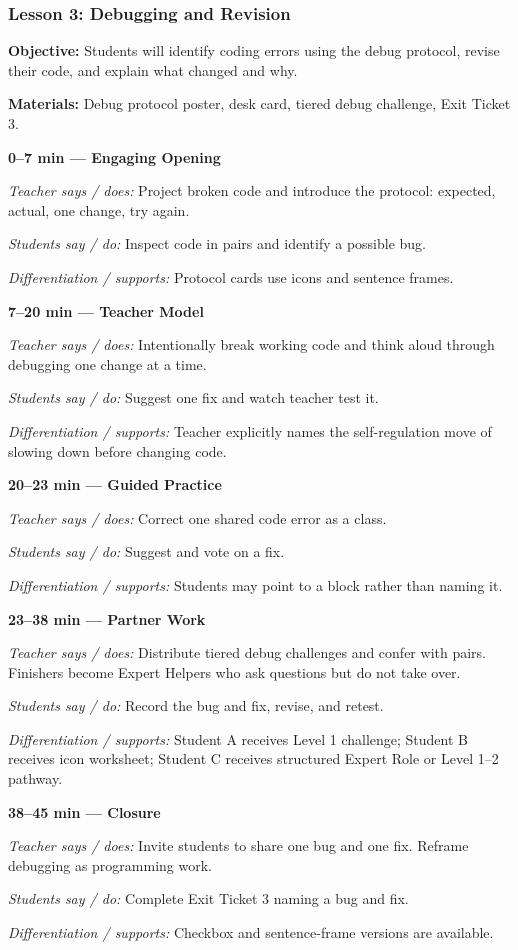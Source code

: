 \documentclass[12pt]{article}
\newcommand{\lessonphase}[5]{%
\noindent\textbf{\color{brickRed}#1 --- #2}\par
\textit{Teacher says / does:} #3\par
\textit{Students say / do:} #4\par
\textit{Differentiation / supports:} #5\par\medskip
}
\begin{document}
\subsubsection*{Lesson 3: Debugging and Revision}
\textbf{Objective:} Students will identify coding errors using the debug protocol, revise their code, and explain what changed and why.\par
\textbf{Materials:} Debug protocol poster, desk card, tiered debug challenge, Exit Ticket 3.\par
\begin{designbox}
\lessonphase{0--7 min}{Engaging Opening}{Project broken code and introduce the protocol: expected, actual, one change, try again.}{Inspect code in pairs and identify a possible bug.}{Protocol cards use icons and sentence frames.}
\lessonphase{7--20 min}{Teacher Model}{Intentionally break working code and think aloud through debugging one change at a time.}{Suggest one fix and watch teacher test it.}{Teacher explicitly names the self-regulation move of slowing down before changing code.}
\lessonphase{20--23 min}{Guided Practice}{Correct one shared code error as a class.}{Suggest and vote on a fix.}{Students may point to a block rather than naming it.}
\lessonphase{23--38 min}{Partner Work}{Distribute tiered debug challenges and confer with pairs. Finishers become Expert Helpers who ask questions but do not take over.}{Record the bug and fix, revise, and retest.}{Student A receives Level 1 challenge; Student B receives icon worksheet; Student C receives structured Expert Role or Level 1--2 pathway.}
\lessonphase{38--45 min}{Closure}{Invite students to share one bug and one fix. Reframe debugging as programming work.}{Complete Exit Ticket 3 naming a bug and fix.}{Checkbox and sentence-frame versions are available.}
\end{designbox}
\end{document}
